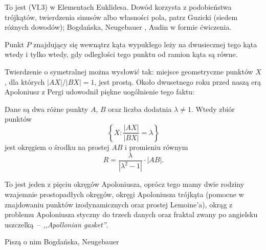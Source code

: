 To jest (VI.3) w Elementach Euklidesa.
Dowód korzysta z podobieństwa trójkątów, twierdzenia sinusów albo własności pola, patrz Guzicki \cite[s. 120]{guzicki_2021} (siedem różnych dowodów); Bogdańska, Neugebauer \cite[s. 73]{neugebauer_2018}, Audin \cite[s. 102]{audin_2003} w formie ćwiczenia.

\begin{proposition} %
	Punkt $P$ znajdujący się wewnątrz kąta wypukłego leży na dwusiecznej tego kąta wtedy i tylko wtedy, gdy odległości tego punktu od ramion kąta są równe.
\end{proposition}




Twierdzenie o symetralnej %
można wysłowić tak: miejsce geometryczne punktów $X$, dla których $|AX|/|BX| = 1$, jest prostą.
Około dwusetnego roku przed naszą erą Apoloniusz z Pergi udowodnił piękne uogólnienie tego faktu:

\begin{definition} %
	Dane są dwa różne punkty $A$, $B$ oraz liczba dodatnia $\lambda \neq 1$.
	Wtedy zbiór punktów 
	\begin{equation}
		\left\{X : \frac{|AX|}{|BX|} = \lambda \right\}
	\end{equation}
	jest okręgiem o środku na prostej $AB$ i promieniu równym
	\begin{equation}
		R = \frac{\lambda}{|\lambda^2 - 1|} \cdot |AB|.
	\end{equation}
\end{definition}

To jest jeden z pięciu okręgów Apoloniusza, oprócz tego mamy dwie rodziny wzajemnie prostopadłych okręgów, okręgi Apoloniusza trójkąta (pomocne w znajdowaniu punktów izodynamicznych oraz prostej Lemoine'a), okrąg z problemu Apoloniusza styczny do trzech danych oraz fraktal zwany po angielsku uszczelką -- \emph{,,Apollonian gasket''}.

Piszą o nim Bogdańska, Neugebauer \cite[s. 74]{neugebauer_2018}



